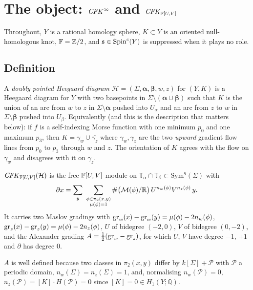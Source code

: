 \section{The object: $\mathit{CFK}^\infty$ and $\mathit{CFK}_{\mathbb{F}[U,V]}$}\label{sec:cfk}

Throughout, $Y$ is a rational homology sphere, $K\subset Y$ is an oriented null-homologous knot,
$\mathbb{F}=\mathbb{Z}/2$, and $\mathfrak s\in\mathrm{Spin}^c(Y)$ is suppressed when it plays no role.

\subsection{Definition}
A \emph{doubly pointed Heegaard diagram} $\mathcal H=(\Sigma,\boldsymbol\alpha,\boldsymbol\beta,w,z)$ for
$(Y,K)$ is a Heegaard diagram for $Y$ with two basepoints in $\Sigma\setminus(\boldsymbol\alpha\cup\boldsymbol\beta)$
such that $K$ is the union of an arc from $w$ to $z$ in $\Sigma\setminus\boldsymbol\alpha$ pushed into
$U_\alpha$ and an arc from $z$ to $w$ in $\Sigma\setminus\boldsymbol\beta$ pushed into $U_\beta$.
Equivalently (and this is the description that matters below): if $f$ is a self-indexing Morse
function with one minimum $p_0$ and one maximum $p_3$, then $K=\gamma_w\cup\overline{\gamma_z}$
where $\gamma_w,\gamma_z$ are the two \emph{upward} gradient flow lines from $p_0$ to $p_3$ through
$w$ and $z$.  The orientation of $K$ agrees with the flow on $\gamma_w$ and disagrees with it on $\gamma_z$.

\begin{definition}
$\mathit{CFK}_{\mathbb{F}[U,V]}(\mathcal H)$ is the free $\mathbb{F}[U,V]$-module on $\mathbb T_\alpha\cap\mathbb T_\beta\subset\mathrm{Sym}^g(\Sigma)$ with
\[
\partial x=\sum_{y}\ \sum_{\substack{\phi\in\pi_2(x,y)\\ \mu(\phi)=1}} \#\big(\cM(\phi)/\R\big)\, U^{n_w(\phi)}V^{n_z(\phi)}\, y .
\]
It carries two Maslov gradings with
$\mathrm{gr}_w(x)-\mathrm{gr}_w(y)=\mu(\phi)-2n_w(\phi)$, $\mathrm{gr}_z(x)-\mathrm{gr}_z(y)=\mu(\phi)-2n_z(\phi)$,
$U$ of bidegree $(-2,0)$, $V$ of bidegree $(0,-2)$, and the Alexander grading
$A=\tfrac12(\mathrm{gr}_w-\mathrm{gr}_z)$, for which $U$, $V$ have degree $-1$, $+1$ and $\partial$ has degree $0$.
\end{definition}

$A$ is well defined because two classes in $\pi_2(x,y)$ differ by $k[\Sigma]+\mathcal P$ with
$\mathcal P$ a periodic domain, $n_w(\Sigma)=n_z(\Sigma)=1$, and, normalising $n_w(\mathcal P)=0$,
$n_z(\mathcal P)=[K]\cdot H(\mathcal P)=0$ since $[K]=0\in H_1(Y;\mathbb Q)$.

